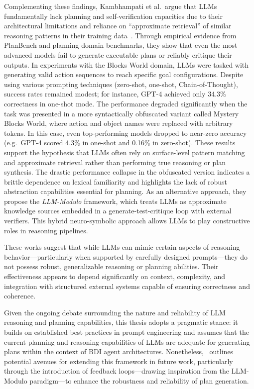 \documentclass[12pt,a4paper,openright,twoside]{book}
\begin{document}
Complementing these findings, Kambhampati et al.\ argue that LLMs fundamentally lack planning and self-verification capacities due to their architectural limitations and reliance on ``approximate retrieval'' of similar reasoning patterns in their training data~\cite{kambhampatiCanLargeLanguage2024, kambhampatiLLMsCantPlan2024}.
%
Through empirical evidence from PlanBench and planning domain benchmarks, they show that even the most advanced models fail to generate executable plans or reliably critique their outputs. 
%
In experiments with the Blocks World domain, \acp{LLM} were tasked with generating valid action sequences to reach specific goal configurations.
%
Despite using various prompting techniques (zero-shot, one-shot, Chain-of-Thought), success rates remained modest; for instance, GPT-4 achieved only 34.3\% correctness in one-shot mode.
%
The performance degraded significantly when the task was presented in a more syntactically obfuscated variant called Mystery Blocks World, where action and object names were replaced with arbitrary tokens.
%
In this case, even top-performing models dropped to near-zero accuracy (e.g.\, GPT-4 scored 4.3\% in one-shot and 0.16\% in zero-shot).
%
These results support the hypothesis that LLMs often rely on surface-level pattern matching and approximate retrieval rather than performing true reasoning or plan synthesis. 
%
The drastic performance collapse in the obfuscated version indicates a brittle dependence on lexical familiarity and highlights the lack of robust abstraction capabilities essential for planning.
%
As an alternative approach, they propose the \textit{LLM-Modulo} framework, which treats LLMs as approximate knowledge sources embedded in a generate-test-critique loop with external verifiers. This hybrid neuro-symbolic approach allows LLMs to play constructive roles in reasoning pipelines.

These works suggest that while LLMs can mimic certain aspects of reasoning behavior---particularly when supported by carefully designed prompts---they do not possess robust, generalizable reasoning or planning abilities.
%
Their effectiveness appears to depend significantly on context, complexity, and integration with structured external systems capable of ensuring correctness and coherence.

Given the ongoing debate surrounding the nature and reliability of \ac{LLM} reasoning and planning capabilities, this thesis adopts a pragmatic stance: it builds on established best practices in prompt engineering and assumes that the current planning and reasoning capabilities of \acp{LLM} are adequate for generating plans within the context of BDI agent architectures.
%
Nonetheless,~ outlines potential avenues for extending this framework in future work, particularly through the introduction of feedback loops---drawing inspiration from the LLM-Modulo paradigm---to enhance the robustness and reliability of plan generation.
\end{document}
